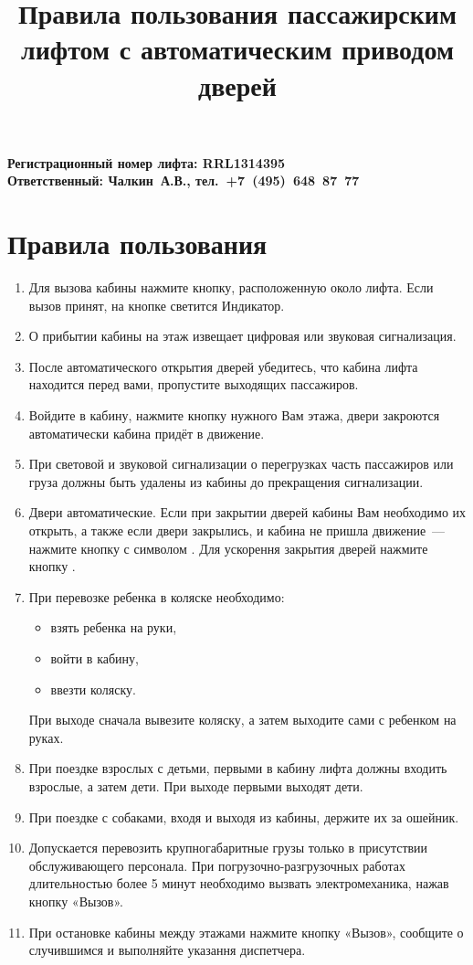 \documentclass[10pt, a4paper]{article}
\title{Правила пользования пассажирским лифтом с автоматическим приводом дверей}
\newcommand{\ffbox}[1]{%
  {%
   \setlength{\fboxsep}{-1\fboxrule}%
   \fbox{\hspace{2.3pt}\strut#1\hspace{2.3pt}}%
  }%
}
\begin{document}
\textbf{
  \mbox{}\hfill Регистрационный номер лифта: RRL1314395\\
  \mbox{}\hfill Ответственный: Чалкин~А.В., тел.~+7~(495)~648~87~77
}

\section*{Правила пользования}

\begin{enumerate}
  \item Для вызова кабины нажмите кнопку, расположенную около лифта. Если вызов принят, на кнопке светится Индикатор.
  \item О прибытии кабины на этаж извещает цифровая или звуковая сигнализация.
  \item После автоматического открытия дверей убедитесь, что кабина лифта находится перед вами, пропустите выходящих пассажиров.
  \item Войдите в кабину, нажмите кнопку нужного Вам этажа, двери закроются автоматически кабина придёт в движение.
  \item При световой и звуковой сигнализации о перегрузках часть пассажиров или груза должны быть удалены из кабины до прекращения
    сигнализации.
  \item Двери автоматические. Если при закрытии дверей кабины Вам необходимо их открыть, а также если двери закрылись, и кабина не пришла
    движение~--- нажмите кнопку с символом \ffbox{\textlangle~||~\textrangle}. Для ускорення закрытия дверей нажмите кнопку
    \ffbox{\textbf{\textrangle~||~\textlangle}}.
  \item При перевозке ребенка в коляске необходимо:
    \begin{itemize}
      \item взять ребенка на руки,
      \item войти в кабину,
      \item ввезти коляску.
    \end{itemize}
    При выходе сначала вывезите коляску, а затем выходите сами с ребенком на руках.
  \item При поездке взрослых с детьми, первыми в кабину лифта должны входить взрослые, а затем дети. При выходе первыми выходят дети.
  \item При поездке с собаками, входя и выходя из кабины, держите их за ошейник.
  \item Допускается перевозить крупногабаритные грузы только в присутствии обслуживающего персонала. При погрузочно-разгрузочных работах
    длительностью более 5 минут необходимо вызвать электромеханика, нажав кнопку «Вызов».
  \item При остановке кабины между этажами нажмите кнопку «Вызов», сообщите о случившимся и выполняйте указання диспетчера.
\end{enumerate}
\end{document}
